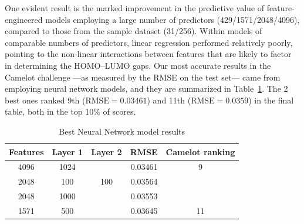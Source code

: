 \documentclass[11pt]{article}
\begin{document}
One evident result is the marked improvement in the predictive value of feature-engineered models employing a large number of predictors (429/1571/2048/4096), compared to those from the sample dataset (31/256). Within models of comparable numbers of predictors, linear regression performed relatively poorly, pointing to the non-linear interactions between features that are likely to factor in determining the HOMO--LUMO gaps. Our most accurate results in the Camelot challenge ---as measured by the RMSE on the test set--- came from employing neural network models, and they are summarized in Table~\ref{tab:DLresults}. The 2 best ones ranked 9th ($\textrm{RMSE}= 0.03461$) and 11th ($\textrm{RMSE}= 0.0359$) in the final table, both in the top 10\% of scores.

\begin{table}[h]
\centering
\begin{tabular}{cccrc}
 Features & Layer 1 & Layer 2 & RMSE & Camelot ranking\\
 \midrule
4096 & 1024 & & 0.03461 & 9 \\
2048 & 100 & 100 & 0.03564 \\
2048 & 1000 & & 0.03553 \\
1571 & 500 & & 0.03645 & 11 \\
\end{tabular}
\caption{\label{tab:DLresults} Best Neural Network model results}
\end{table}



\end{document}
